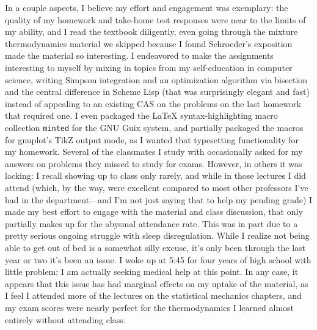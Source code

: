 \documentclass[12pt]{article}
\begin{document}
In a couple aspects, I believe my effort and engagement was exemplary: the quality of my homework and take-home test responses were
near to the limits of my ability, and I read the textbook diligently, even going through the mixture thermodynamics material
we skipped because I found Schroeder's exposition made the material so interesting.
I endeavored to make the assignments interesting to myself by mixing in topics from my self-education in computer science, writing
Simpson integration and an optimization algorithm via bisection and the central difference in Scheme Lisp (that was surprisingly elegant and
fast) instead of appealing to an existing CAS on the problems on the last homework that required one.
I even packaged the {\LaTeX} syntax-highlighting macro collection \verb|minted| for the GNU Guix system, and partially packaged the
macros for gnuplot's TikZ output mode, as I wanted that typesetting functionality for my homework.
Several of the classmates I study with occasionally asked for my answers on problems they missed to study for exams.
However, in others it was lacking: I recall showing up to class only rarely, and while in those lectures I did attend (which, by the way,
were excellent compared to most other professors I've had in the department---and I'm not just saying that to help my pending grade)
I made my best effort to engage with the material and class discussion, that only partially makes up for the abysmal attendance rate.
This was in part due to a pretty serious ongoing struggle with sleep disregulation.
While I realize not being able to get out of bed is a somewhat silly excuse, it's only been through the last year or two it's been an issue.
I woke up at 5:45 for four years of high school with little problem; I am actually seeking medical help at this point.
In any case, it appears that this issue has had marginal effects on my uptake of the material, as I feel I attended more of the lectures on
the statistical mechanics chapters, and my exam scores were nearly perfect for the thermodynamics I learned almost entirely without attending
class.
\end{document}
